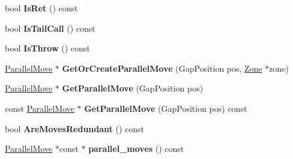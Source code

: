 \begin{DoxyCompactItemize}
\item 
bool {\bfseries Is\+Ret} () const \hypertarget{classv8_1_1internal_1_1compiler_1_1_instruction_a7617ff0f85ad18abc45e15a0b86fb89a}{}\label{classv8_1_1internal_1_1compiler_1_1_instruction_a7617ff0f85ad18abc45e15a0b86fb89a}

\item 
bool {\bfseries Is\+Tail\+Call} () const \hypertarget{classv8_1_1internal_1_1compiler_1_1_instruction_a901eb688084ca8e8e3161f8c0abb9453}{}\label{classv8_1_1internal_1_1compiler_1_1_instruction_a901eb688084ca8e8e3161f8c0abb9453}

\item 
bool {\bfseries Is\+Throw} () const \hypertarget{classv8_1_1internal_1_1compiler_1_1_instruction_a4427d836968ce06ac57b8bdecb230f26}{}\label{classv8_1_1internal_1_1compiler_1_1_instruction_a4427d836968ce06ac57b8bdecb230f26}

\item 
\hyperlink{classv8_1_1internal_1_1compiler_1_1_parallel_move}{Parallel\+Move} $\ast$ {\bfseries Get\+Or\+Create\+Parallel\+Move} (Gap\+Position pos, \hyperlink{classv8_1_1internal_1_1_zone}{Zone} $\ast$zone)\hypertarget{classv8_1_1internal_1_1compiler_1_1_instruction_a5965a0a4c7e6c4f31d51593f41eda19c}{}\label{classv8_1_1internal_1_1compiler_1_1_instruction_a5965a0a4c7e6c4f31d51593f41eda19c}

\item 
\hyperlink{classv8_1_1internal_1_1compiler_1_1_parallel_move}{Parallel\+Move} $\ast$ {\bfseries Get\+Parallel\+Move} (Gap\+Position pos)\hypertarget{classv8_1_1internal_1_1compiler_1_1_instruction_ae22ba27557d85b3a917b460da496a233}{}\label{classv8_1_1internal_1_1compiler_1_1_instruction_ae22ba27557d85b3a917b460da496a233}

\item 
const \hyperlink{classv8_1_1internal_1_1compiler_1_1_parallel_move}{Parallel\+Move} $\ast$ {\bfseries Get\+Parallel\+Move} (Gap\+Position pos) const \hypertarget{classv8_1_1internal_1_1compiler_1_1_instruction_a337f6de898ec06cd70ded7d74a18a9f9}{}\label{classv8_1_1internal_1_1compiler_1_1_instruction_a337f6de898ec06cd70ded7d74a18a9f9}

\item 
bool {\bfseries Are\+Moves\+Redundant} () const \hypertarget{classv8_1_1internal_1_1compiler_1_1_instruction_ab7bb6ecaac4f15f93bf6c0151a1e3d29}{}\label{classv8_1_1internal_1_1compiler_1_1_instruction_ab7bb6ecaac4f15f93bf6c0151a1e3d29}

\item 
\hyperlink{classv8_1_1internal_1_1compiler_1_1_parallel_move}{Parallel\+Move} $\ast$const $\ast$ {\bfseries parallel\+\_\+moves} () const \hypertarget{classv8_1_1internal_1_1compiler_1_1_instruction_a80cf09e13864fd538125d4f4c2a78da2}{}\label{classv8_1_1internal_1_1compiler_1_1_instruction_a80cf09e13864fd538125d4f4c2a78da2}


\end{DoxyCompactItemize}
